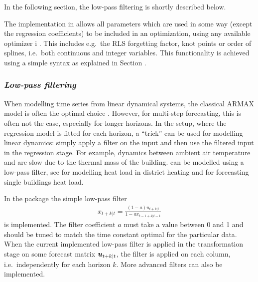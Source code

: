 In the following section, the low-pass filtering is shortly described
below. 

The implementation in \onlineforecast allows all parameters which are used in
some way (except the regression coefficients) to be included in an optimization,
using any available optimizer i \Rprog. This includes e.g.\ the RLS forgetting
factor, knot points or order of splines, i.e.\ both continuous and integer
variables. This functionality is achieved using a simple syntax as explained in
Section .


\subsubsection{\it Low-pass filtering}
\label{sec:low-pass-filtering}

When modelling time series from linear dynamical systems, the classical ARMAX
model is often the optimal choice \citep{madsen2007time}. However, for
multi-step forecasting, this is often not the case, especially for longer
horizons. In the \onlineforecast setup, where the regression model is fitted for
each horizon, a ``trick'' can be used for modelling linear dynamics: simply
apply a filter on the input and then use the filtered input in the regression
stage. For example, dynamics between ambient air temperature and  are slow due to the thermal mass of the
building. can
be modelled using a low-pass filter, see \cite{nielsen2006modelling} for
modelling heat load in district heating and \cite{bacher2013short} for
forecasting single buildings heat load.

In the package the simple low-pass filter
\begin{align}
  x_{t+k|t} = \frac{(1-a) u_{t+k|t}}{1-a x_{t-1+k|t-1}}
\end{align}
is implemented. The filter coefficient $a$ must take a value between 0 and 1 and
should be tuned to match the time constant optimal for the particular
data. When the current implemented low-pass filter is applied in the
transformation stage on some forecast matrix $\mbox{\boldmath{$u$}}_{t+k|t}$, the filter is
applied on each column, i.e.\ independently for each horizon $k$. More advanced
filters can also be implemented.

